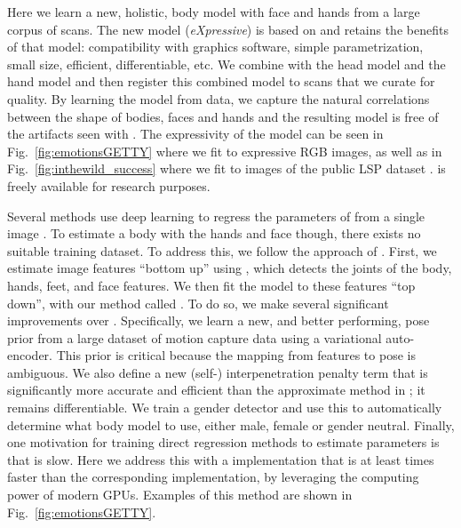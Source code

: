Here we learn a new, holistic, body model with face and hands from a large corpus of \threeD scans.
The new \emph{\smplHF} model (\emph{\smpl eXpressive}) is based on \smpl and retains the benefits of that model: compatibility with graphics software, simple parametrization, small size, efficient, differentiable, etc.
We combine \smpl with the \flame head model \cite{li2017learning} and the \mano hand model \cite{romero2017embodied} and then register this combined model to  \threeD scans that we curate for quality.
By learning the model from data, we capture the natural correlations between the shape of bodies, faces and hands and the resulting model is free of the artifacts seen with \frank.
The expressivity of the model can be seen in Fig.~\ref{fig:emotionsGETTY} where we fit \smplHF to  expressive RGB images, as well as in Fig.~\ref{fig:inthewild_success} where we fit \smplHF to images of the public LSP dataset \cite{johnson2010clustered}. 
\smplHF is freely available for research purposes.

Several methods use deep learning to regress the parameters of \smpl from a single image \cite{kanazawa2018end,omran2018neural,pavlakos2018learning}. 
To estimate a \threeD body with the hands and face though, there exists no suitable training dataset. 
To address this, we follow the approach of \smplify. 
First, we  estimate \twoD image features ``bottom up'' using \openpose \cite{cao2017realtime,simon2017hand,wei2016convolutional}, which detects the joints of the body, hands, feet, and face features.
We then fit the \smplHF model to these \twoD features ``top down'', with our method called \emph{\smplifyPP}. 
To do so, we make several significant improvements over \smplify.
Specifically, we learn a new, and better performing, pose prior from a large dataset of motion capture data \citeMOSH using a variational auto-encoder.
This prior is critical because the mapping from \twoD features to \threeD pose is ambiguous.
We also define a new (self-) interpenetration penalty term that is significantly more accurate and efficient than the approximate method in \smplify; it remains differentiable.
We train a gender detector and use this to automatically determine what body model to use, either male, female or gender neutral.
Finally, one motivation for training direct regression methods to estimate \smpl parameters is that \smplify is slow.
Here we address this with a \pytorch implementation that is at least  times faster than the corresponding \chumpy implementation, by leveraging the computing power of modern GPUs.
Examples of this \smplifyPP method are shown in Fig.~\ref{fig:emotionsGETTY}.

